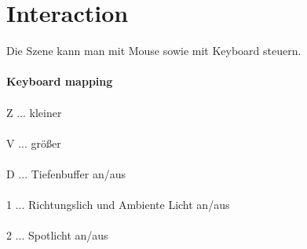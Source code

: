 \documentclass[12pt]{article}
\begin{document}
\pagebreak

\section{Interaction}
Die Szene kann man mit Mouse sowie mit Keyboard steuern.\\\\
\textbf{Keyboard mapping} \\\\
Z ... kleiner \\\\
V ... größer \\\\
D ... Tiefenbuffer an/aus \\\\
1 ... Richtungslich und Ambiente Licht an/aus \\\\
2 ... Spotlicht an/aus
\end{document}
